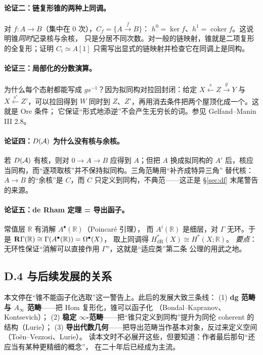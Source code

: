 \paragraph{论证二：链复形锥的两种上同调。}
对 $f\colon A\to B$（集中在 $0$ 次），$C_f=\{A\xrightarrow{f}B\}$：
$h^0=\ker f$、$h^1=\operatorname{coker}f$。这说明锥\emph{同时}记录核与余核，
只是分居不同次数。对一般的链映射，锥就是二项复形的全复形；证明
$C_i\simeq A[1]$ 只需写出显式的链映射并检查它在同调上是同构。

\paragraph{论证三：局部化的分数演算。}
为什么每个态射都能写成 $gs^{-1}$？因为拟同构对拉回封闭：给定
$X\xleftarrow{s}Z\xrightarrow{g}Y$ 与 $X\xleftarrow{s'}Z'$，可以拉回得到
$W$ 同时到 $Z$、$Z'$，再用消去条件把两个屋顶化成一个。这就是 Ore 条件；
它保证“形式地添逆”不会产生无穷长的词。参见 Gelfand--Manin III 2.8。

\paragraph{论证四：$D(\mathcal{A})$ 为什么没有核与余核。}
若 $D(\mathcal{A})$ 有核，则对 $0\to A\to B$ 应得到 $A$；但把 $A$ 换成拟同构的
$A'$ 后，核应当同构，而“逐项取核”并不保持拟同构。三角范畴用“补齐成特异三角”
替代核：$A\to B$ 的“余核”是 $C$，而 $C$ 只定义到同构，不典范——这正是
§\ref{sec:df} 末尾警告的来源。

\paragraph{论证五：de Rham 定理 = 导出函子。}
常值层 $\mathbb R$ 有消解 $A^\bullet(\mathbb R)$（Poincaré 引理），
而 $A^i(\mathbb R)$ 是细层，对 $\Gamma$ 无环。于是
$\mathbf{R}\Gamma(\mathbb R)\cong\Gamma(A^\bullet(\mathbb R))=\Omega^\bullet(X)$，
取上同调得 $H^*_{\mathrm{dR}}(X)\cong H^*(X;\mathbb R)$。
\emph{要点}：无环性保证“消解可以直接作用 $\Gamma$”，这就是“适应类”第二条
公理的用武之地。

\subsection*{D.4 与后续发展的关系}

本文停在“锥不能函子化选取”这一警告上。此后的发展大致三条线：
(1) \textbf{dg 范畴与 $A_\infty$ 范畴}——把 Hom 复形化，锥可以函子化
（Bondal--Kapranov、Kontsevich）；
(2) \textbf{稳定 $\infty$-范畴}——把“锥只定义到同构”提升为同伦 coherent 的
结构（Lurie）；
(3) \textbf{导出代数几何}——把导出范畴当作基本对象，反过来定义空间
（Toën--Vezzosi、Lurie）。
读本文时不必展开这些，但要知道：作者最后那句“还应当有某种更精细的概念”，
在二十年后已经成为主流。


